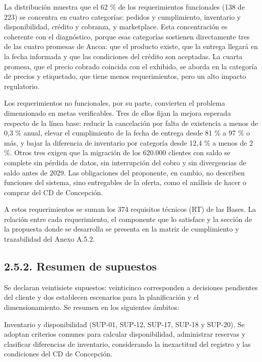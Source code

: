 \documentclass[11pt]{article}
\begin{document}
La distribución muestra que el 62 \% de los requerimientos funcionales (138 de 223) se concentra en cuatro categorías: pedidos y cumplimiento, inventario y disponibilidad, crédito y cobranza, y marketplace. Esta concentración es coherente con el diagnóstico, porque esas categorías sostienen directamente tres de las cuatro promesas de Ancoa: que el producto existe, que la entrega llegará en la fecha informada y que las condiciones del crédito son aceptadas. La cuarta promesa, que el precio cobrado coincida con el exhibido, se aborda en la categoría de precios y etiquetado, que tiene menos requerimientos, pero un alto impacto regulatorio.

Los requerimientos no funcionales, por su parte, convierten el problema dimensionado en metas verificables. Tres de ellos fijan la mejora esperada respecto de la línea base: reducir la cancelación por falta de existencia a menos de 0,3 \% anual, elevar el cumplimiento de la fecha de entrega desde 81 \% a 97 \% o más, y bajar la diferencia de inventario por categoría desde 12,4 \% a menos de 2 \%. Otros tres exigen que la migración de los 620.000 clientes con saldo se complete sin pérdida de datos, sin interrupción del cobro y sin divergencias de saldo antes de 2029. Las obligaciones del proponente, en cambio, no describen funciones del sistema, sino entregables de la oferta, como el análisis de hacer o comprar del CD de Concepción.

A estos requerimientos se suman los 374 requisitos técnicos (RT) de las Bases. La relación entre cada requerimiento, el componente que lo satisface y la sección de la propuesta donde se desarrolla se presenta en la matriz de cumplimiento y trazabilidad del Anexo A.5.2.

\subsection{2.5.2. Resumen de supuestos}\label{resumen-de-supuestos}

Se declaran veintisiete supuestos: veinticinco corresponden a decisiones pendientes del cliente y dos establecen escenarios para la planificación y el dimensionamiento. Se resumen en los siguientes ámbitos:

Inventario y disponibilidad (SUP-01, SUP-12, SUP-17, SUP-18 y SUP-20). Se adoptan criterios comunes para calcular disponibilidad, administrar reservas y clasificar diferencias de inventario, considerando la inexactitud del registro y las condiciones del CD de Concepción.
\end{document}
